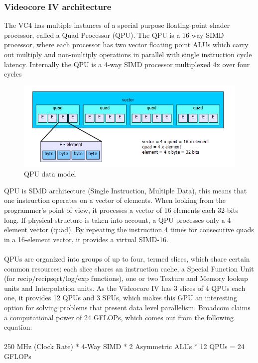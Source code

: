 \documentclass[12pt,a4paper,oneside]{article}
\begin{document}
\subsubsection*{Videocore IV architecture}
The VC4 has multiple instances of a special purpose floating-point shader processor,
called a Quad Processor (QPU). The QPU is a 16-way SIMD processor, where each
processor has two vector floating point ALUs which carry out multiply and
non-multiply operations in parallel with single instruction cycle latency.
Internally the QPU is a 4-way SIMD processor multiplexed 4x over four cycles
\begin{figure}[H]
\centering
  \includegraphics[scale=0.85]{img/vc4_qpu_vector.png}
  \caption{QPU data model}
  \label{fig:html_output}
\end{figure}
QPU is SIMD architecture (Single Instruction, Multiple Data), this means that one
instruction operates on a vector of elements. When looking from the programmer's
point of view, it processes a vector of 16 elements each 32-bits long. If physical
structure is taken into account, a QPU processes only a 4-element vector (quad).
By repeating the instruction 4 times for consecutive quads in a 16-element vector,
it provides a virtual SIMD-16.\\\\
QPUs are organized into groups of up to four, termed slices, which share certain
common resources: each slice shares an instruction cache, a Special Function Unit
(for recip/recipsqrt/log/exp functions), one or two Texture and Memory lookup units
and Interpolation units. As the Videocore IV has 3 slices of 4 QPUs each one,
it provides 12 QPUs and 3 SFUs, which makes this GPU an interesting option for
solving problems that present data level parallelism. Broadcom claims a computational
power of 24 GFLOPs, which comes out from the following equation:\\\\
250 MHz (Clock Rate) * 4-Way SIMD * 2 Asymmetric ALUs * 12 QPUs = 24 GFLOPs
\end{document}
